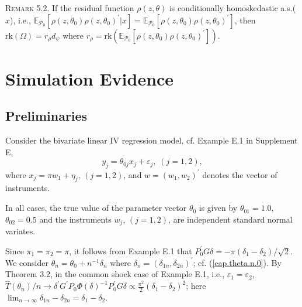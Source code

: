 \documentclass[hidelinks, 11 pt, a4paper, pdflatex]{article}
\begin{document}
{    \textsc{Remark 5.2}. If the residual function $\rho(z,\theta)$ is conditionally homoskedastic a.s.($x$), i.e.,
     $\mathbb{E}_{\mathcal{P}_{0}}[\rho(z,\theta_{0})\rho(z,\theta_{0})^{\prime}|x] = \mathbb{E}_{\mathcal{P}_{0}}[\rho(z,\theta_{0})\rho(z,\theta_{0})^{\prime}]$, then $\mathrm{rk}(\Omega) = r_{\rho}d_{\psi}$ where $r_{\rho} = \mathrm{rk}(\mathbb{E}_{\mathcal{P}_{0}}[\rho(z,\theta_{0})\rho (z,\theta_{0})^{\prime}])$.



 \section{Simulation Evidence}

  \setcounter{equation}{0}


  \subsection{Preliminaries}

   \indent Consider the bivariate linear IV regression model, cf. Example E.1 in Supplement E,
    \begin{equation*}
     y_{j} = \theta_{0j}x_{j} + \varepsilon_{j}, \; (j=1,2),
    \end{equation*}
   where $x_{j} = \pi w_{1} + \eta_{j}$, $(j=1,2)$, and $w =(w_{1},w_{2})^{\prime}$ denotes the vector of instruments.

   In all cases, the true value of the parameter vector $\theta_{0}$ is given by $\theta_{01} = 1.0$, $\theta_{02} = 0.5$ and the instruments $w_{j}$, $(j=1,2)$, are independent standard normal variates.

   Since $\pi_{1} = \pi_{2} = \pi$, it follows from Example E.1 that $P_0^{\prime}G\delta = - \pi (\delta_1 - \delta_2)/\sqrt{2}$. We consider  $\theta_{n} = \theta_0 + n^{-1}\delta_n$ where $\delta_n = (\delta_{1n},\delta_{2n})^{\prime}$; cf. (\ref{cap.theta.n.0}). By Theorem 3.2, in the common shock case of Example E.1, i.e., $\varepsilon_{1} = \varepsilon_{2}$, $\hat{T}(\theta_n)/n \rightarrow \delta^{\prime}G^{\prime}P_0 \Phi(\delta)^{-1} P_0^{\prime}G\delta \propto \frac{\pi^2}{2} (\delta_1 - \delta_2)^2$; here $\lim_{n \rightarrow \infty}\delta_{1n} - \delta_{2n} = \delta_1 - \delta_2$.


}
\end{document}

